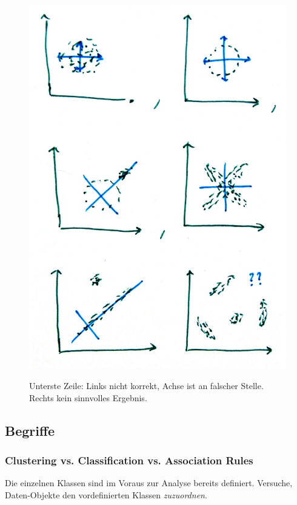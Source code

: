 \documentclass[10pt]{article} %
\begin{document}
\begin{figure}[H]
    \centering
    \includegraphics[width=0.8\columnwidth]{figures/pca-examples.pdf}
    \label{fig:pca-examples}
    \caption{Unterste Zeile: Links nicht korrekt, Achse ist an falscher Stelle. Rechts kein sinnvolles Ergebnis.}
\end{figure}



\subsection{Begriffe}

\subsubsection{Clustering vs. Classification vs. Association Rules}

\begin{definition}[Classification] Die einzelnen Klassen sind im Voraus zur Analyse bereits definiert. Versuche, Daten-Objekte den vordefinierten Klassen \textit{zuzuordnen}.
\end{definition}
\end{document}

